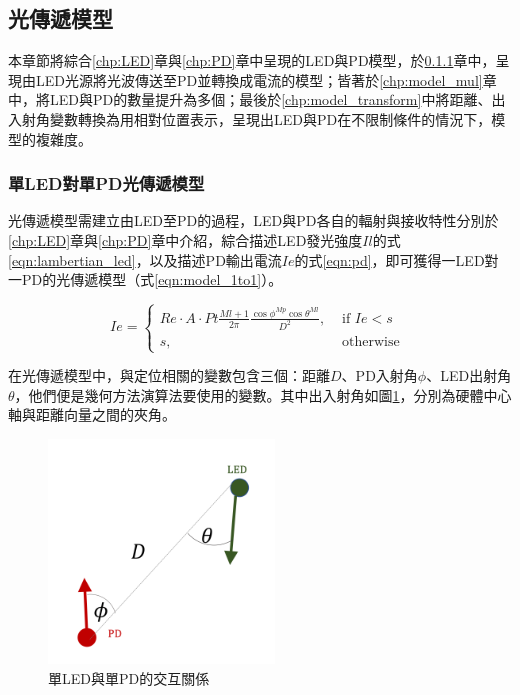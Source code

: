         

    \subsection{光傳遞模型}
    \label{chp:model}

    本章節將綜合\ref{chp:LED}章與\ref{chp:PD}章中呈現的LED與PD模型，於\ref{chp:model_1to1}章中，呈現由LED光源將光波傳送至PD並轉換成電流的模型；皆著於\ref{chp:model_mul}章中，將LED與PD的數量提升為多個；最後於\ref{chp:model_transform}中將距離、出入射角變數轉換為用相對位置表示，呈現出LED與PD在不限制條件的情況下，模型的複雜度。
    
    \subsubsection{單LED對單PD光傳遞模型}
    \label{chp:model_1to1}

    光傳遞模型需建立由LED至PD的過程，LED與PD各自的輻射與接收特性分別於\ref{chp:LED}章與\ref{chp:PD}章中介紹，綜合描述LED發光強度$Il$的式\ref{eqn:lambertian_led}，以及描述PD輸出電流$Ie$的式\ref{eqn:pd}，即可獲得一LED對一PD的光傳遞模型（式\ref{eqn:model_1to1}）。

    \begin{equation}
        \label{eqn:model_1to1}
        Ie = \begin{cases}Re \cdot A\cdot Pt\frac{Ml+1}{2\pi}\frac{\cos \phi^{Mp}\cos \theta^{Ml}}{D^2}, & \text { if } Ie<s \\ s, & \text { otherwise }\end{cases}
    \end{equation}

    在光傳遞模型中，與定位相關的變數包含三個：距離$D$、PD入射角$\phi$、LED出射角$\theta$，他們便是幾何方法演算法要使用的變數。其中出入射角如圖\ref{pic:interactive_1to1}，分別為硬體中心軸與距離向量之間的夾角。

    \begin{figure}[ht]
        \centering
        \includegraphics[width=6cm]{ch2pic/interactive_1to1.png}
        \caption{單LED與單PD的交互關係}
        \label{pic:interactive_1to1}
    \end{figure}

